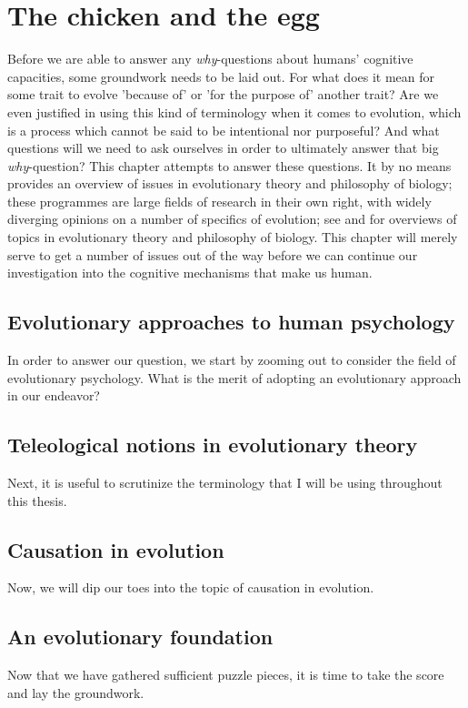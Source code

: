 \chapter{The chicken and the egg}


Before we are able to answer any \emph{why}-questions about humans' cognitive capacities, some groundwork needs to be laid out. For what does it mean for some trait to evolve 'because of' or 'for the purpose of' another trait? Are we even justified in using this kind of terminology when it comes to evolution, which is a process which cannot be said to be intentional nor purposeful? And what questions will we need to ask ourselves in order to ultimately answer that big  \emph{why}-question?
This chapter attempts to answer these questions. It by no means provides an overview of issues in evolutionary theory and philosophy of biology; these programmes are large fields of research in their own right, with widely diverging opinions on a number of specifics of evolution; see \citet{Ariew02} and \citet{UllerLaland19} for overviews of topics in evolutionary theory and philosophy of biology.
This chapter will merely serve to get a number of issues out of the way before we can continue our investigation into the cognitive mechanisms that make us human.

\section{Evolutionary approaches to human psychology}

In order to answer our question, we start by zooming out to consider the field of evolutionary psychology. What is the merit of adopting an evolutionary approach in our endeavor?

\section{Teleological notions in evolutionary theory}

Next, it is useful to scrutinize the terminology that I will be using throughout this thesis.

\section{Causation in evolution}

Now, we will dip our toes into the topic of causation in evolution.

\section{An evolutionary foundation}

Now that we have gathered sufficient puzzle pieces, it is time to take the score and lay the groundwork.
